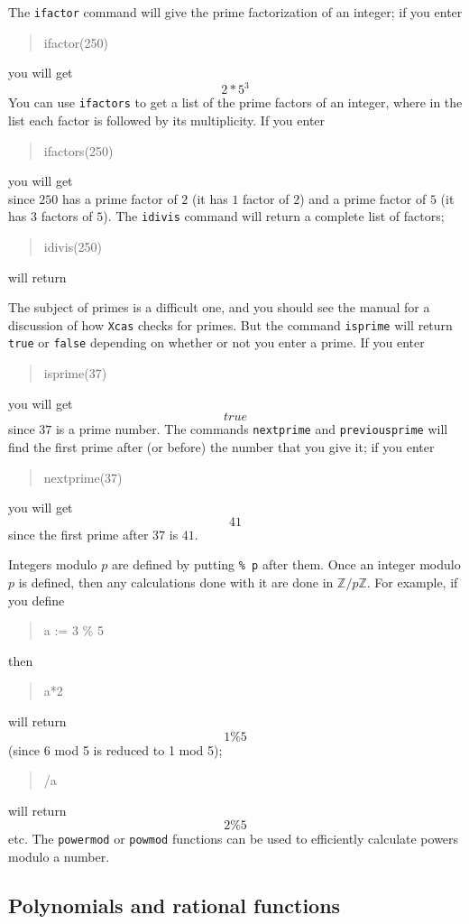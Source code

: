 \documentclass{article}
\newcommand{\Z}{{\mathbb{Z}}}
\newcommand{\xcasin}[1]
{\begin{quote}\ttfamily
#1
\end{quote}}
\newcommand{\xcasout}[1]
{\begin{equation*}
#1
\end{equation*}}
\begin{document}
The \texttt{ifactor} command will give the prime factorization of an
integer; if you enter
\xcasin{ifactor(250)}
you will get
\xcasout{2*5^3}
You can use \texttt{ifactors} to get a list of the prime factors of an
integer, where in the list each factor is followed by its multiplicity.
If you enter
\xcasin{ifactors(250)}
you will get
\xcasout{[2,1,5,3]}
since $250$ has a prime factor of $2$ (it has $1$ factor of $2$) and a
prime factor of $5$ (it has $3$ factors of $5$).
The \texttt{idivis} command will return a complete list of factors;
\xcasin{idivis(250)}
will return
\xcasout{[1,2,5,10,25,50,125,250]}

The subject of primes is a difficult one, and you should see the
manual for a discussion of how \texttt{Xcas} checks for primes.  But
the command \texttt{isprime} will return \texttt{true} or \texttt{false}
depending on whether or not you enter a prime.  If you enter
\xcasin{isprime(37)}
you will get
\xcasout{true}
since $37$ is a prime number.  The commands \texttt{nextprime} and
\texttt{previousprime} will find the first prime after (or before) the
number that you give it; if you enter
\xcasin{nextprime(37)}
you will get
\xcasout{41}
since the first prime after $37$ is $41$.

Integers modulo $p$ are defined by putting \texttt{\% p} after them.
Once an integer modulo $p$ is defined, then any calculations done with
it are done in $\Z/p\Z$.  For example, if you define
\xcasin{a := 3 \% 5}
then
\xcasin{a*2}
will return
\xcasout{1 \% 5}
(since 6 mod 5 is reduced to 1 mod 5); 
\xcasin{1/a}
will return
\xcasout{2 \% 5}
etc.  The \texttt{powermod} or \texttt{powmod} functions can be used
to efficiently calculate powers modulo a number.


\subsection{Polynomials and rational functions}
\end{document}
